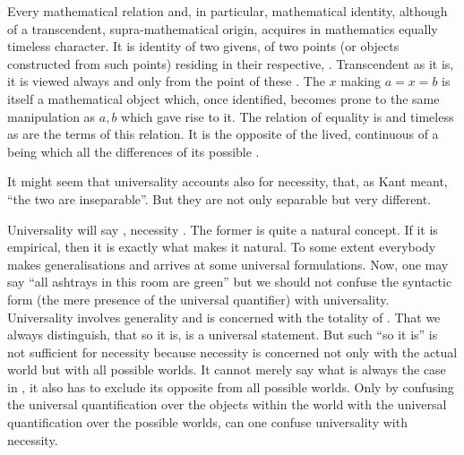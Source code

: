 {}
Every mathematical relation and, in particular, mathematical identity, although
of a transcendent, supra-mathematical origin, acquires in mathematics equally
timeless character.  It is identity of two  givens, of two points
(or objects constructed from such points) residing in their respective,
.  Transcendent as it is, it is viewed always and
only from the point of these . The $x$ making $a=x=b$ is itself
a mathematical object which, once identified, becomes prone to the same
manipulation as $a,b$ which gave rise to it. The relation of equality is  and
timeless as are the terms of this relation.  It is the opposite of the lived,
continuous  of a being which  all the differences of its
possible .

\label{pa:necessity}
It might seem that universality accounts also for necessity, that, as
Kant meant, ``the two are inseparable''.  But they are not only
separable but very different.  

Universality will say , necessity
.  The former is quite a natural
concept.  If it is empirical, then it is exactly what makes it
natural.  To some extent everybody makes generalisations and arrives
at some universal formulations.  Now, one may say ``all ashtrays in
this room are green'' but we should not confuse the syntactic form
(the mere presence of the universal quantifier) with universality. 
Universality involves generality and is concerned with the totality of
.  That we always distinguish, that so it is, is a
universal statement.  But such ``so it is'' is not sufficient for
necessity because necessity is concerned not only with the actual
world but with all possible worlds.  It cannot merely say what is always the
case in , it also has to exclude its opposite from all possible worlds. 
Only by confusing the universal quantification over the objects within
the world with the universal quantification over the possible worlds, 
can one confuse universality with necessity.

